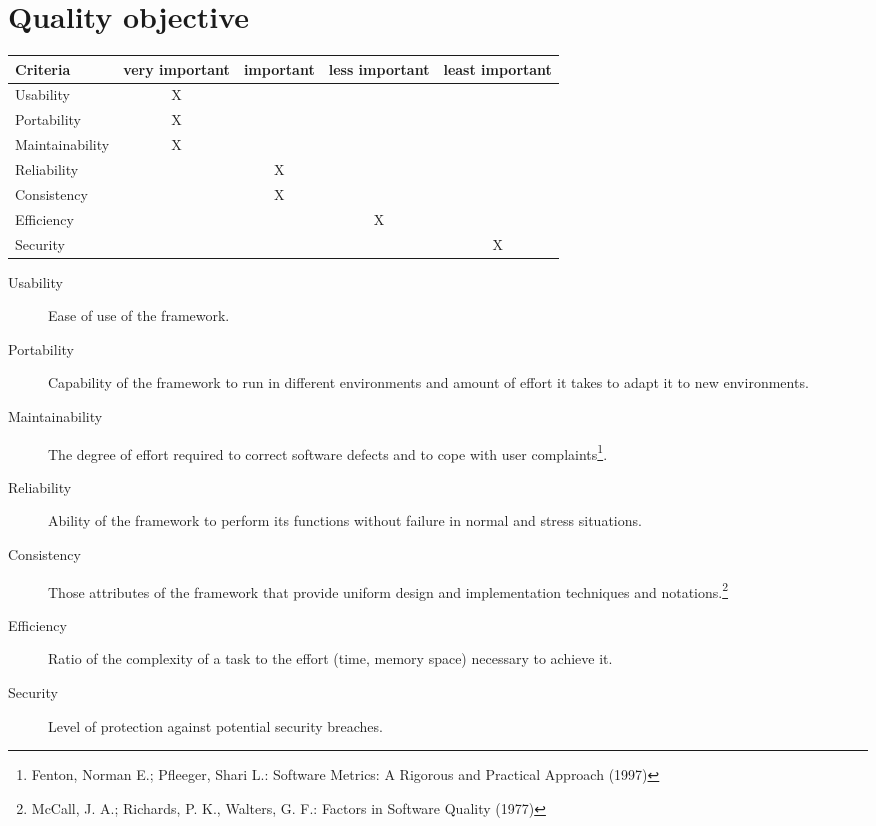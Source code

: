 \section{Quality objective}

\begin{tabular}{lcccc}
\hline
\textbf{Criteria} & \textbf{very important} & \textbf{important} & \textbf{less important} & \textbf{least important} \\
\hline
Usability & X & & & \\
Portability & X & & & \\
Maintainability & X & & & \\
Reliability & & X & & \\
Consistency & & X & & \\
Efficiency & & & X & \\
Security & & & & X \\
\hline

\end{tabular}


\begin{description}
	\item[Usability] Ease of use of the framework.
	\item[Portability] Capability of the framework to run in different environments and amount of effort it takes to adapt it to new environments.
	\item[Maintainability] The degree of effort required to correct software defects and to cope with user complaints\footnote{Fenton, Norman E.; Pfleeger, Shari L.: Software Metrics: A Rigorous and Practical Approach (1997)}.
	\item[Reliability] Ability of the framework to perform its functions without failure in normal and stress situations.
	\item[Consistency] Those attributes of the framework that provide uniform design and implementation techniques and notations.\footnote{McCall, J. A.; Richards, P. K., Walters, G. F.: Factors in Software Quality (1977)}
	\item[Efficiency] Ratio of the complexity of a task to the effort (time, memory space) necessary to achieve it.
	\item[Security] Level of protection against potential security breaches.
	
\end{description}